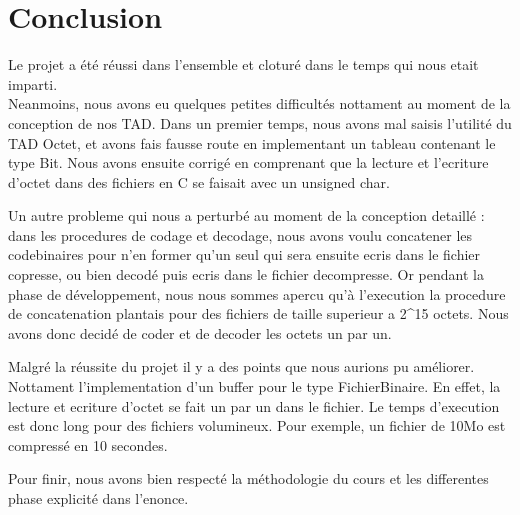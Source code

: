 \chapter{Conclusion}

Le projet a \'{e}t\'{e} réussi dans l'ensemble et cloturé dans le temps qui nous etait imparti. \\

Neanmoins, nous avons eu quelques petites difficultés nottament au moment de la conception de nos TAD. Dans un premier temps, nous avons mal saisis l'utilité du TAD Octet, et avons fais fausse route en implementant un tableau contenant le type Bit. Nous avons ensuite corrigé en comprenant que la lecture et l'ecriture d'octet dans des fichiers en C se faisait avec un unsigned char.

Un autre probleme qui nous a perturbé au moment de la conception detaillé : dans les procedures de codage et decodage, nous avons voulu concatener les codebinaires pour n'en former qu'un seul qui sera ensuite ecris dans le fichier copresse, ou bien decodé puis ecris dans le fichier decompresse. Or pendant la phase de développement, nous nous sommes apercu qu'à l'execution la procedure de concatenation plantais pour des fichiers de taille superieur a 2^15 octets. Nous avons donc decidé de coder et de decoder les octets un par un. 

Malgr\'{e} la r\'{e}ussite du projet il y a des points que nous aurions pu am\'{e}liorer. Nottament l'implementation d'un buffer pour le type FichierBinaire. En effet, la lecture et ecriture d'octet se fait un par un dans le fichier. Le temps d'execution est donc long pour des fichiers volumineux. Pour exemple, un fichier de 10Mo est compressé en 10 secondes. 

Pour finir, nous avons bien respecté la méthodologie du cours et les differentes phase explicité dans l'enonce.



